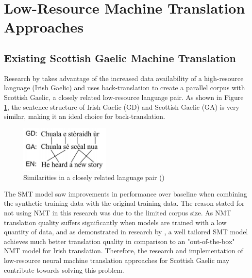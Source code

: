 

\section{Low-Resource Machine Translation Approaches}
\label{LRNMT}


\subsection{Existing Scottish Gaelic Machine Translation}

Research by \cite{dowling_leveraging_2019} takes advantage of the increased data availability of a high-resource language (Irish Gaelic) and uses back-translation to create a parallel corpus with Scottish Gaelic, a closely related low-resource language pair. As shown in Figure \ref{fig:lang_pair}, the sentence structure of Irish Gaelic (GD) and Scottish Gaelic (GA) is very similar, making it an ideal choice for back-translation.

\begin{figure}[ht!]
\centering
\includegraphics[width=0.4\textwidth]{media/literature/nmt_approaches/lr_gaelic.png}
\caption[Diagram of the similarities in a closely related language pair]{Similarities in a closely related language pair (\cite{dowling_leveraging_2019})}
\label{fig:lang_pair}
\end{figure}


The \acrshort{SMT} model saw improvements in performance over baseline when combining the synthetic training data with the original training data. The reason stated for not using \acrshort{NMT} in this research was due to the limited corpus size. As \acrshort{NMT} translation quality suffers significantly when models are trained with a low quantity of data, and as demonstrated in research by \cite{dowling_smt_2018}, a well tailored \acrshort{SMT} model achieves much better translation quality in comparison to an "out-of-the-box" \acrshort{NMT} model for Irish translation. Therefore, the research and implementation of low-resource neural machine translation approaches for Scottish Gaelic may contribute towards solving this problem.

